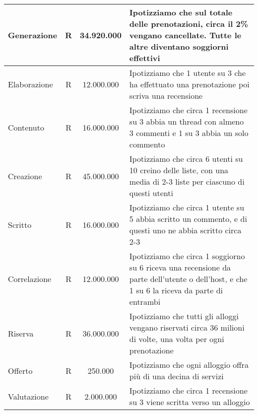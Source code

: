\begin{longtable}{|l|c|c|p{6.2cm}|}
    Generazione              & R             & 34.920.000      & {Ipotizziamo che sul totale delle prenotazioni, circa il 2\% vengano cancellate. Tutte le altre diventano soggiorni effettivi}               \\\hline
    Elaborazione             & R             & 12.000.000      & {Ipotizziamo che 1 utente su 3 che ha effettuato una prenotazione poi scriva una recensione}                                                 \\\hline
    Contenuto                & R             & 16.000.000      & {Ipotizziamo che circa 1 recensione su 3 abbia un thread con almeno 3 commenti e 1 su 3 abbia un solo commento}                              \\\hline
    Creazione                & R             & 45.000.000      & {Ipotizziamo che circa 6 utenti su 10 creino delle liste, con una media di 2-3 liste per ciascuno di questi utenti}                          \\\hline
    Scritto                  & R             & 16.000.000      & {Ipotizziamo che circa 1 utente su 5 abbia scritto un commento, e di questi uno ne abbia scritto circa 2-3}                                  \\\hline
    Correlazione             & R             & 12.000.000      & {Ipotizziamo che circa 1 soggiorno su 6 riceva una recensione da parte dell'utente o dell'host, e che 1 su 6 la riceva da parte di entrambi} \\\hline
    Riserva                  & R             & 36.000.000      & {Ipotizziamo che tutti gli alloggi vengano riservati circa 36 milioni di volte, una volta per ogni prenotazione}                             \\\hline
    Offerto                  & R             & 250.000         & {Ipotizziamo che ogni alloggio offra più di una decina di servizi}                                                                           \\\hline
    Valutazione              & R             & 2.000.000       & {Ipotizziamo che circa 1 recensione su 3 viene scritta verso un alloggio}                                                                    \\\hline
\end{longtable}
\normalsize 